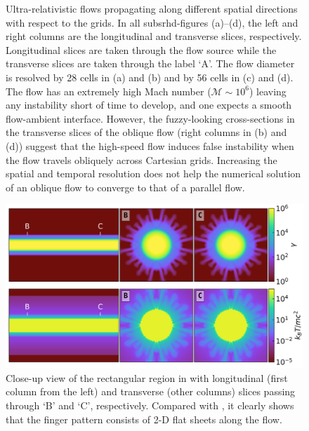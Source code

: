 \begin{figure}
{      \label{fig:DiagonalFlowHig} %
    }
  \caption{
Ultra-relativistic flows propagating along different spatial directions with respect to the grids. In all subsrhd-figures (a)--(d), the left and right columns are the longitudinal and transverse slices, respectively. Longitudinal slices are taken through the flow source while the transverse slices are taken through the label `A'. The flow diameter is resolved by 28 cells in (a) and (b) and by 56 cells in (c) and (d). The flow has an extremely high Mach number ($\mathscr{M}\sim 10^{6}$) leaving any instability short of time to develop, and one expects a smooth flow-ambient interface. However, the fuzzy-looking cross-sections in the transverse slices of the oblique flow (right columns in (b) and (d)) suggest that the high-speed flow induces false instability when the flow travels obliquely across Cartesian grids. Increasing the spatial and temporal resolution does not help the numerical solution of an oblique flow to converge to that of a parallel flow.}
  \label{fig:GridEffect}
\end{figure}






\begin{figure}
\includegraphics[width=\columnwidth]{srhd-figures/fig__HorizontalFlowHigZoomIn.png}
\centering
\caption{Close-up view of the rectangular region in  with longitudinal (first column from the left) and transverse (other columns) slices passing through `B' and `C', respectively. Compared with , it clearly shows that the finger pattern consists of 2-D flat sheets along the flow.}
\label{fig:HorizontalFlowHigZoomIn}
\end{figure}


